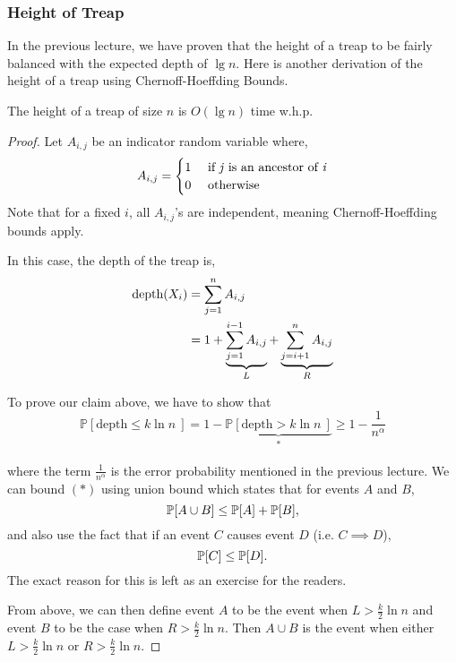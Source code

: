 \documentclass[12pt]{article}
\begin{document}
\subsubsection{Height of Treap}

In the previous lecture, we have proven that the height of a treap to be fairly balanced with the expected depth of $\lg {n}$. Here is another derivation of the height of a treap using Chernoff-Hoeffding Bounds. 

\begin{lemma} The height of a treap of size $n$ is $O(\lg n)$ time w.h.p. 
\end{lemma}
\begin{proof}
\setlength{\parindent}{1cm} Let $A_{i,j}$ be an indicator random variable where, $$A_{i,j} = \begin{cases}
1 &\text{ if \textit{j} is an ancestor of \textit{i}} \\
0 &\text{ otherwise}
\end{cases}
$$
Note that for a fixed $i$, all $A_{i,j}$'s are independent, meaning Chernoff-Hoeffding bounds apply.

In this case, the depth of the treap is,
\newline \begin{align*}
\textmd{depth}(X_{i})  &= \sum_{j=1}^{n} A_{i,j}\\
&= 1 + \underbrace{\sum_{j=1}^{i-1}A_{i,j}}_{L} +\underbrace{\sum_{j=i+1}^{n}A_{i,j}}_{R}\\
\end{align*}

To prove our claim above, we have to show that $$ \mathbb{P}[\text{depth} \leq  k\ln{n} \ ] = 1-\underbrace{ \mathbb{P}[ \text{depth} >  k\ln{n} \ ]}_{*}\geq 1- \frac{1}{n^{\alpha}}$$\\
where the term  $\frac{1}{n^{\alpha}}$ is the error probability mentioned in the previous lecture. We can bound $(*)$ using union bound which states that for events $A$ and $B$, 
$$\mathbb{P}[A \cup B] \leq \mathbb{P}[A] + \mathbb{P}[B], $$
and also use the fact that if an event $C$ causes event $D$ (i.e. $C \implies D$), 
$$ \mathbb{P}[C] \leq \mathbb{P}[D].$$
The exact reason for this is left as an exercise for the readers.

From above, we can then define event $A$ to be the event when $L>  \frac{k}{2}\ln{n}$ and event $B$ to be the case when $R >  \frac{k}{2}\ln{n}$. Then $A\cup B$ is the event when either $L> \frac{k}{2}\ln{n}$ or $R >  \frac{k}{2}\ln{n}$.


\end{proof}
\end{document}
